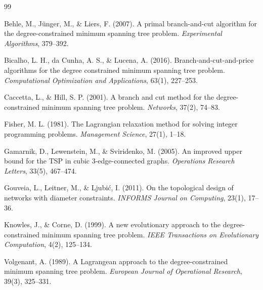 \documentclass[12pt]{article}
\begin{document}
\newpage
\begin{thebibliography}{99}

Behle, M., J\"unger, M., \& Liers, F. (2007). 
\newblock A primal branch-and-cut algorithm for the degree-constrained minimum spanning tree problem. 
\newblock \emph{Experimental Algorithms}, 379--392.

Bicalho, L. H., da Cunha, A. S., \& Lucena, A. (2016). 
\newblock Branch-and-cut-and-price algorithms for the degree constrained minimum spanning tree problem. 
\newblock \emph{Computational Optimization and Applications}, 63(1), 227--253.

Caccetta, L., \& Hill, S. P. (2001). 
\newblock A branch and cut method for the degree-constrained minimum spanning tree problem. 
\newblock \emph{Networks}, 37(2), 74--83.

Fisher, M. L. (1981). 
\newblock The Lagrangian relaxation method for solving integer programming problems. 
\newblock \emph{Management Science}, 27(1), 1--18.

Gamarnik, D., Lewenstein, M., \& Sviridenko, M. (2005). 
\newblock An improved upper bound for the TSP in cubic 3-edge-connected graphs. 
\newblock \emph{Operations Research Letters}, 33(5), 467--474.

Gouveia, L., Leitner, M., \& Ljubi\'c, I. (2011). 
\newblock On the topological design of networks with diameter constraints. 
\newblock \emph{INFORMS Journal on Computing}, 23(1), 17--36.

Knowles, J., \& Corne, D. (1999). 
\newblock A new evolutionary approach to the degree-constrained minimum spanning tree problem. 
\newblock \emph{IEEE Transactions on Evolutionary Computation}, 4(2), 125--134.

Volgenant, A. (1989). 
\newblock A Lagrangean approach to the degree-constrained minimum spanning tree problem. 
\newblock \emph{European Journal of Operational Research}, 39(3), 325--331.

\end{thebibliography}
\end{document}
